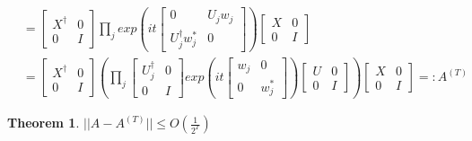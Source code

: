 \documentclass[10pt]{amsart}
\newtheorem{theorem}{Theorem}
\begin{document}
\begin{align}
    & = \begin{bmatrix} X^{\dagger} & 0 \\ 0 & I \end{bmatrix} \prod_j exp(it \begin{bmatrix} 0 &  U_j w_j \\  U^{\dagger}_j w_j^* & 0 \end{bmatrix}) \begin{bmatrix} X & 0 \\ 0 & I \end{bmatrix} \\
    & = \begin{bmatrix} X^{\dagger} & 0 \\ 0 & I \end{bmatrix}
    (\prod_j 
    \begin{bmatrix} U_j^{\dagger} & 0 \\ 0 & I \end{bmatrix}
     exp(it \begin{bmatrix} w_j &  0 \\  0 & w_j^* \end{bmatrix})\begin{bmatrix} U & 0 \\ 0 & I \end{bmatrix} ) \begin{bmatrix} X & 0 \\ 0 & I \end{bmatrix} =: A^{(T)}
\end{align}

\begin{theorem}
$||A - A^(T)|| \leq O(\frac{1}{2^T})$
\end{theorem}


\end{document}
